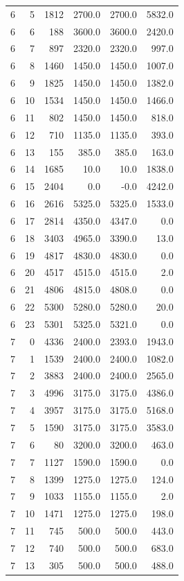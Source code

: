 \begin{longtable}{rrrrrr}
6 & 5 & 1812 & 2700.0 & 2700.0 & 5832.0\\
6 & 6 & 188 & 3600.0 & 3600.0 & 2420.0\\
6 & 7 & 897 & 2320.0 & 2320.0 & 997.0\\
6 & 8 & 1460 & 1450.0 & 1450.0 & 1007.0\\
6 & 9 & 1825 & 1450.0 & 1450.0 & 1382.0\\
6 & 10 & 1534 & 1450.0 & 1450.0 & 1466.0\\
6 & 11 & 802 & 1450.0 & 1450.0 & 818.0\\
6 & 12 & 710 & 1135.0 & 1135.0 & 393.0\\
6 & 13 & 155 & 385.0 & 385.0 & 163.0\\
6 & 14 & 1685 & 10.0 & 10.0 & 1838.0\\
6 & 15 & 2404 & 0.0 & -0.0 & 4242.0\\
6 & 16 & 2616 & 5325.0 & 5325.0 & 1533.0\\
6 & 17 & 2814 & 4350.0 & 4347.0 & 0.0\\
6 & 18 & 3403 & 4965.0 & 3390.0 & 13.0\\
6 & 19 & 4817 & 4830.0 & 4830.0 & 0.0\\
6 & 20 & 4517 & 4515.0 & 4515.0 & 2.0\\
6 & 21 & 4806 & 4815.0 & 4808.0 & 0.0\\
6 & 22 & 5300 & 5280.0 & 5280.0 & 20.0\\
6 & 23 & 5301 & 5325.0 & 5321.0 & 0.0\\
7 & 0 & 4336 & 2400.0 & 2393.0 & 1943.0\\
7 & 1 & 1539 & 2400.0 & 2400.0 & 1082.0\\
7 & 2 & 3883 & 2400.0 & 2400.0 & 2565.0\\
7 & 3 & 4996 & 3175.0 & 3175.0 & 4386.0\\
7 & 4 & 3957 & 3175.0 & 3175.0 & 5168.0\\
7 & 5 & 1590 & 3175.0 & 3175.0 & 3583.0\\
7 & 6 & 80 & 3200.0 & 3200.0 & 463.0\\
7 & 7 & 1127 & 1590.0 & 1590.0 & 0.0\\
7 & 8 & 1399 & 1275.0 & 1275.0 & 124.0\\
7 & 9 & 1033 & 1155.0 & 1155.0 & 2.0\\
7 & 10 & 1471 & 1275.0 & 1275.0 & 198.0\\
7 & 11 & 745 & 500.0 & 500.0 & 443.0\\
7 & 12 & 740 & 500.0 & 500.0 & 683.0\\
7 & 13 & 305 & 500.0 & 500.0 & 488.0\\

\end{longtable}
